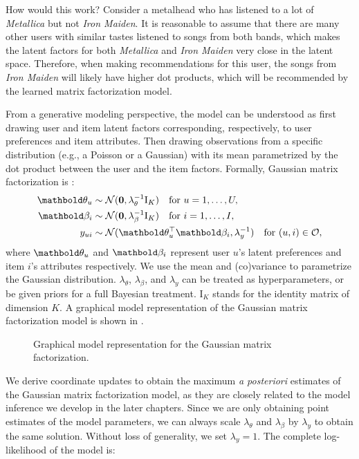 How would this work? Consider a metalhead who has listened to a lot of \textit{Metallica} but not \textit{Iron Maiden}. It is reasonable to assume that there are many other users with similar tastes listened to songs from both bands, which makes the latent factors for both \textit{Metallica} and \textit{Iron Maiden} very close in the latent space. Therefore, when making recommendations for this user, the songs from \textit{Iron Maiden} will likely have higher dot products, which will be recommended by the learned matrix factorization model.  

From a generative modeling perspective, the model can be understood as first drawing user and item latent factors corresponding,
respectively, to user preferences and item attributes. Then drawing 
observations from a specific distribution (e.g., a Poisson
or a Gaussian) with its mean parametrized by the dot product between the user and
the item factors. Formally, Gaussian matrix factorization is \citep{salakhutdinov2008probabilistic}: 
\begin{equation} 
\begin{split}
	\mb\theta_{u} &\sim \mathcal{N}(\bzero, \lambda_\theta^{-1} \mathrm{I}_K) \quad \textrm{for } u = 1, \dots, U, \\
	\mb\beta_{i} &\sim \mathcal{N}(\bzero, \lambda_\beta^{-1} \mathrm{I}_K) \quad \textrm{for } i = 1, \dots, I, \\
	y_{ui} &\sim \mathcal{N}(\mb\theta_u^\top \mb\beta_i, \lambda_y^{-1}) \quad \textrm{for } (u, i) \in \cO, 
 \end{split}
 \label{chpt:background:eq:gmf}
 \end{equation}
where $\mb\theta_u$ and $\mb\beta_i$ represent user $u$'s latent preferences and item $i$'s attributes respectively. We use the mean and (co)variance to
parametrize the Gaussian distribution. $\lambda_\theta$, $\lambda_\beta$, and
$\lambda_y$ can be treated as hyperparameters, or be given priors for a full Bayesian treatment. $\mathrm{I}_K$ stands for the identity
matrix of dimension $K$. A graphical model representation of the Gaussian matrix factorization model is shown in .

\begin{figure}[ht]
  \centering
     
  \caption{Graphical model representation for the Gaussian matrix factorization.}
\label{chpt:background:fig:gmf}
\end{figure}

We derive coordinate updates to obtain the maximum \textit{a posteriori} estimates of the Gaussian matrix factorization model, as they are closely related to the model inference we develop in the later chapters. Since we are only obtaining point estimates of the model parameters, we can always scale $\lambda_\theta$ and $\lambda_\beta$ by $\lambda_y$ to obtain the same solution. Without loss of generality, we set $\lambda_y = 1$. The complete log-likelihood of the model is:

